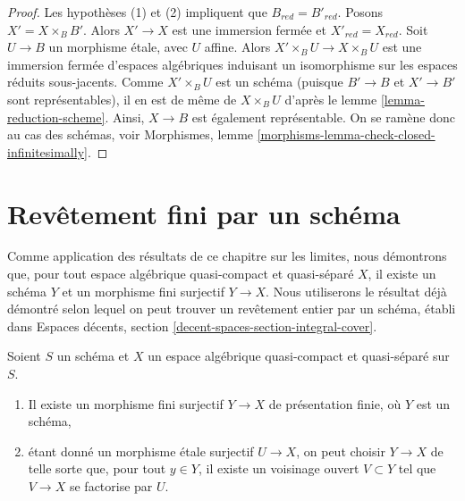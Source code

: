 \begin{proof}
Les hypothèses (1) et (2) impliquent que $B_{red} = B'_{red}$.
Posons $X' = X \times_B B'$. Alors $X' \to X$ est une immersion fermée
et $X'_{red} = X_{red}$. Soit $U \to B$ un morphisme étale,
avec $U$ affine. Alors $X' \times_B U \to X \times_B U$ est une
immersion fermée d'espaces algébriques induisant un isomorphisme
sur les espaces réduits sous-jacents. Comme $X' \times_B U$ est un schéma
(puisque $B' \to B$ et $X' \to B'$ sont représentables), il en est de même de
$X \times_B U$ d'après le lemme \ref{lemma-reduction-scheme}.
Ainsi, $X \to B$ est également représentable. On se ramène donc au
cas des schémas, voir
Morphismes, lemme \ref{morphisms-lemma-check-closed-infinitesimally}.
\end{proof}










\section{Revêtement fini par un schéma}
\label{section-finite-cover}

\noindent
Comme application des résultats de ce chapitre sur les limites, nous démontrons que, pour
tout espace algébrique quasi-compact et quasi-séparé $X$, il existe un schéma
$Y$ et un morphisme fini surjectif $Y \to X$. Nous utiliserons le résultat déjà
démontré selon lequel on peut trouver un revêtement entier par un schéma,
établi dans
Espaces décents, section \ref{decent-spaces-section-integral-cover}.

\begin{proposition}
\label{proposition-there-is-a-scheme-finite-over}
Soient $S$ un schéma et $X$ un espace algébrique quasi-compact et quasi-séparé
sur $S$.
\begin{enumerate}
\item Il existe un morphisme fini surjectif $Y \to X$
de présentation finie, où $Y$ est un schéma,
\item étant donné un morphisme étale surjectif $U \to X$, on peut choisir
$Y \to X$ de telle sorte que, pour tout $y \in Y$, il existe un voisinage ouvert
$V \subset Y$ tel que $V \to X$ se factorise par $U$.
\end{enumerate}
\end{proposition}

